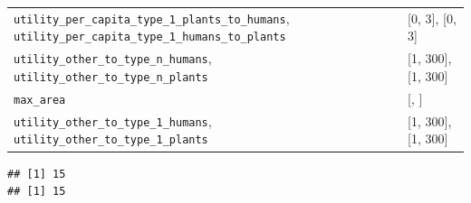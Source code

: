 \documentclass[
]{book}
\begin{document}
\begin{longtable}[]{@{}ll@{}}
\begin{minipage}[t]{0.33\columnwidth}\raggedright
\texttt{utility\_per\_capita\_type\_1\_plants\_to\_humans}, \texttt{utility\_per\_capita\_type\_1\_humans\_to\_plants}\strut
\end{minipage} & \begin{minipage}[t]{0.62\columnwidth}\raggedright
{[}0, 3{]}, {[}0, 3{]}\strut
\end{minipage}\tabularnewline
\begin{minipage}[t]{0.33\columnwidth}\raggedright
\texttt{utility\_other\_to\_type\_n\_humans}, \texttt{utility\_other\_to\_type\_n\_plants}\strut
\end{minipage} & \begin{minipage}[t]{0.62\columnwidth}\raggedright
{[}1, 300{]}, {[}1, 300{]}\strut
\end{minipage}\tabularnewline
\begin{minipage}[t]{0.33\columnwidth}\raggedright
\texttt{max\_area}\strut
\end{minipage} & \begin{minipage}[t]{0.62\columnwidth}\raggedright
{[}, {]}\strut
\end{minipage}\tabularnewline
\begin{minipage}[t]{0.33\columnwidth}\raggedright
\texttt{utility\_other\_to\_type\_1\_humans}, \texttt{utility\_other\_to\_type\_1\_plants}\strut
\end{minipage} & \begin{minipage}[t]{0.62\columnwidth}\raggedright
{[}1, 300{]}, {[}1, 300{]}\strut
\end{minipage}\tabularnewline
\bottomrule
\end{longtable}

\begin{verbatim}
## [1] 15
## [1] 15
\end{verbatim}
\end{document}
